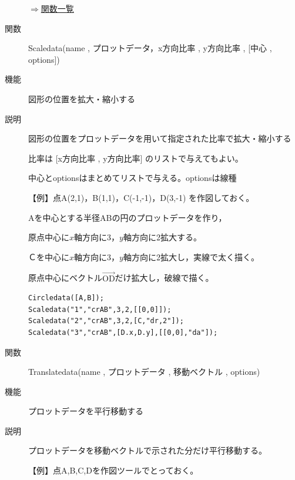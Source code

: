 \documentclass[papersize,a4paper,10pt,uplatex]{jsarticle}
\begin{document}
\begin{description}
\begin{flushright}\hyperlink{functionlist}{$\Rightarrow$関数一覧}\end{flushright}

\vspace{\baselineskip}
\hypertarget{scaledata}{}
\item[関数]Scaledata(name , プロットデータ，x方向比率 , y方向比率 , [中心 , options])
\item[機能]図形の位置を拡大・縮小する
\item[説明]図形の位置をプロットデータを用いて指定された比率で拡大・縮小する

比率は [x方向比率 , y方向比率] のリストで与えてもよい。

中心とoptionsはまとめてリストで与える。optionsは線種

\vspace{\baselineskip}
【例】点A(2,1)，B(1,1)，C(-1,-1)，D(3,-1) を作図しておく。

 Aを中心とする半径ABの円のプロットデータを作り，

原点中心に$x$軸方向に3，$y$軸方向に2拡大する。

Ｃを中心に$x$軸方向に3，$y$軸方向に2拡大し，実線で太く描く。

原点中心にベクトル$\overrightarrow{\mathrm{OD}} $だけ拡大し，破線で描く。
\begin{verbatim}
Circledata([A,B]);
Scaledata("1","crAB",3,2,[[0,0]]);
Scaledata("2","crAB",3,2,[C,"dr,2"]);
Scaledata("3","crAB",[D.x,D.y],[[0,0],"da"]);
\end{verbatim}

\vspace{0mm}
 \begin{center}  \end{center}


\vspace{\baselineskip}
\hypertarget{translatedata}{}
\item[関数]Translatedata(name , プロットデータ , 移動ベクトル , options)
\item[機能]プロットデータを平行移動する
\item[説明]プロットデータを移動ベクトルで示された分だけ平行移動する。

\vspace{\baselineskip}
【例】点A,B,C,Dを作図ツールでとっておく。


\end{description}
\end{document}

